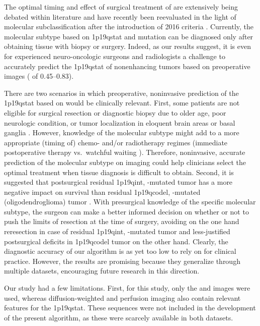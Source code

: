 The optimal timing and effect of surgical treatment of  are extensively being debated within literature and have recently been reevaluated in the light of molecular subclassification after the introduction of  2016 criteria \autocite{wijnenga2017impact, clark2019extent, jakola2017surgical, jiang2017biopsy}.
Currently, the molecular subtype based on \acl{1p19qstat} and  mutation can be diagnosed only after obtaining tissue with biopsy or surgery.
Indeed, as our results suggest, it is even for experienced neuro-oncologic surgeons and radiologists a challenge to accurately predict the \acl{1p19qstat} of nonenhancing \glspl{tumor} based on preoperative  images ( of \numrange{0.45}{0.83}).

There are two scenarios in which preoperative, noninvasive prediction of the \acl{1p19qstat} based on  would be clinically relevant.
First, some patients are not eligible for surgical resection or diagnostic biopsy due to older age, poor neurologic condition, or \gls{tumor} localization in eloquent brain areas or basal ganglia \autocite{jiang2017biopsy}.
However, knowledge of the molecular  subtype might add to a more appropriate (timing of) chemo- and/or radiotherapy regimes (immediate postoperative therapy vs.\ watchful waiting \autocite{ricard2007dynamic}).
Therefore, noninvasive, accurate prediction of the molecular subtype on imaging could help clinicians select the optimal treatment when tissue diagnosis is difficult to obtain.
Second, it is suggested that postsurgical residual \acl{1p19qint}, -mutated \gls{tumor} has a more negative impact on survival than residual \acl{1p19qcodel}, -mutated (oligodendroglioma) \gls{tumor} \autocite{wijnenga2017impact, clark2019extent}.
With presurgical knowledge of the specific molecular subtype, the surgeon can make a better informed decision on whether or not to push the limits of resection at the time of surgery, avoiding on the one hand reresection in case of residual \acl{1p19qint}, -mutated \gls{tumor} and less-justified postsurgical deficits in \acl{1p19qcodel} \gls{tumor} on the other hand.
Clearly, the diagnostic accuracy of our algorithm is as yet too low to rely on for clinical practice.
However, the results are promising because they generalize through multiple datasets, encouraging future research in this direction.

Our study had a few limitations.
First, for this study, only the  and  images were used, whereas diffusion-weighted and perfusion imaging also contain relevant features for the \acl{1p19qstat}.
These sequences were not included in the development of the present algorithm, as these were scarcely available in both datasets.

